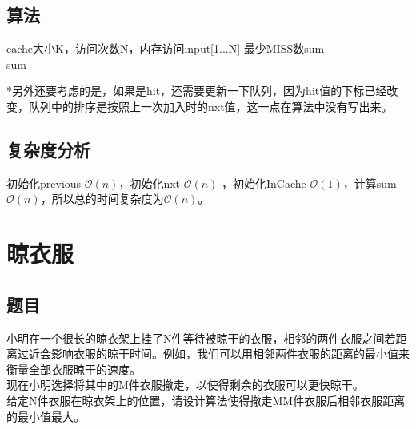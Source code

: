 \documentclass[UTF8]{ctexart}
\begin{document}
\subsection{算法}

\renewcommand{\algorithmicrequire}{\textbf{输入:}}
\renewcommand{\algorithmicensure}{\textbf{输出:}}
\begin{algorithm}
	\caption{}
	\begin{algorithmic}[1]
	\Require cache大小K，访问次数N，内存访问input[1...N]
	\Ensure 最少MISS数sum
	\EndFor
	\EndFor
		\EndIf
	\EndFor
			\Else
			\EndIf
		\EndIf
	\EndFor\\
	\Return sum
	\end{algorithmic}
\end{algorithm}
*另外还要考虑的是，如果是hit，还需要更新一下队列，因为hit值的下标已经改变，队列中的排序是按照上一次加入时的nxt值，这一点在算法中没有写出来。

\subsection{复杂度分析}
初始化previous $\mathcal{O}(n)$，初始化nxt $\mathcal{O}(n)$ ，初始化InCache $\mathcal{O}(1)$，计算sum $\mathcal{O}(n)$，所以总的时间复杂度为$\mathcal{O}(n)$。

\section{晾衣服}

\subsection{题目}
小明在一个很长的晾衣架上挂了N件等待被晾干的衣服，相邻的两件衣服之间若距离过近会影响衣服的晾干时间。例如，我们可以用相邻两件衣服的距离的最小值来衡量全部衣服晾干的速度。\\
现在小明选择将其中的M件衣服撤走，以使得剩余的衣服可以更快晾干。\\
给定N件衣服在晾衣架上的位置，请设计算法使得撤走MM件衣服后相邻衣服距离的最小值最大。\\
\end{document}
